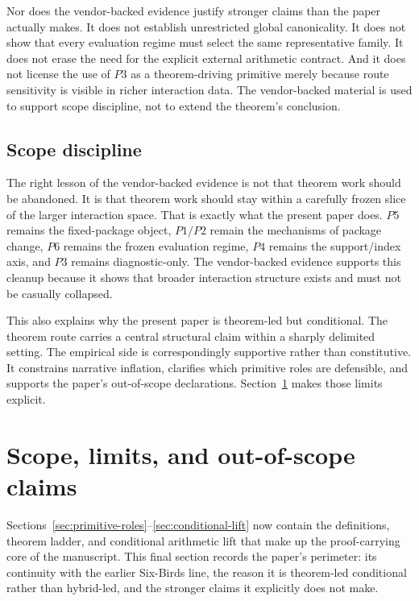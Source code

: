 \documentclass[11pt]{article}
\begin{document}
Nor does the vendor-backed evidence justify stronger claims than the paper
actually makes. It does not establish unrestricted global canonicality. It does
not show that every evaluation regime must select the same representative
family. It does not erase the need for the explicit external arithmetic
contract. And it does not license the use of \(P3\) as a theorem-driving
primitive merely because route sensitivity is visible in richer interaction
data. The vendor-backed material is used to support scope discipline, not to
extend the theorem's conclusion.

\subsection*{Scope discipline}

The right lesson of the vendor-backed evidence is not that theorem work should
be abandoned. It is that theorem work should stay within a carefully frozen
slice of the larger interaction space. That is exactly what the present paper
does. \(P5\) remains the fixed-package object, \(P1/P2\) remain the mechanisms of
package change, \(P6\) remains the frozen evaluation regime, \(P4\) remains the
support/index axis, and \(P3\) remains diagnostic-only. The vendor-backed
evidence supports this cleanup because it shows that broader interaction
structure exists and must not be casually collapsed.

This also explains why the present paper is theorem-led but conditional. The
theorem route carries a central structural claim within a sharply delimited
setting. The empirical side is correspondingly
supportive rather than constitutive. It constrains narrative inflation,
clarifies which primitive roles are defensible, and supports the paper's
out-of-scope declarations. Section~\ref{sec:scope-limits} makes those limits
explicit.
 \section{Scope, limits, and out-of-scope claims}\label{sec:scope-limits}

Sections~\ref{sec:primitive-roles}--\ref{sec:conditional-lift} now contain the
definitions, theorem ladder, and conditional arithmetic lift that make up the
proof-carrying core of the manuscript. This final section records the paper's
perimeter: its continuity with the earlier Six-Birds line, the reason it is
theorem-led conditional rather than hybrid-led, and the stronger claims it
explicitly does not make.
\end{document}
